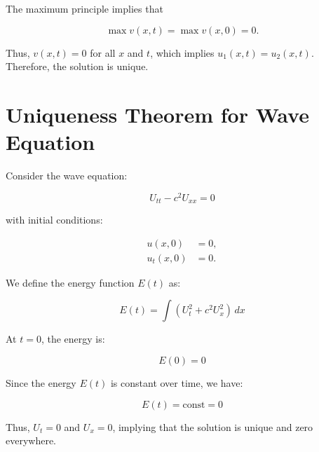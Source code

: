 \documentclass[11pt]{article}
\begin{document}
The maximum principle implies that

\[
\max v(x,t) = \max v(x,0) = 0.
\]

Thus, \( v(x,t) = 0 \) for all \( x \) and \( t \), which implies \( u_1(x,t) = u_2(x,t) \). Therefore, the solution is unique.





\section*{Uniqueness Theorem for Wave Equation}

Consider the wave equation:

\begin{equation}
    U_{tt} - c^2 U_{xx} = 0
\end{equation}

with initial conditions:

\begin{align}
    u(x, 0) &= 0, \\
    u_t(x, 0) &= 0.
\end{align}

We define the energy function \( E(t) \) as:

\begin{equation}
    E(t) = \int \left( U_t^2 + c^2 U_x^2 \right) \, dx
\end{equation}

At \( t = 0 \), the energy is:

\begin{equation}
    E(0) = 0
\end{equation}

Since the energy \( E(t) \) is constant over time, we have:

\begin{equation}
    E(t) = \text{const} = 0
\end{equation}

Thus, \( U_t = 0 \) and \( U_x = 0 \), implying that the solution is unique and zero everywhere.
\end{document}
